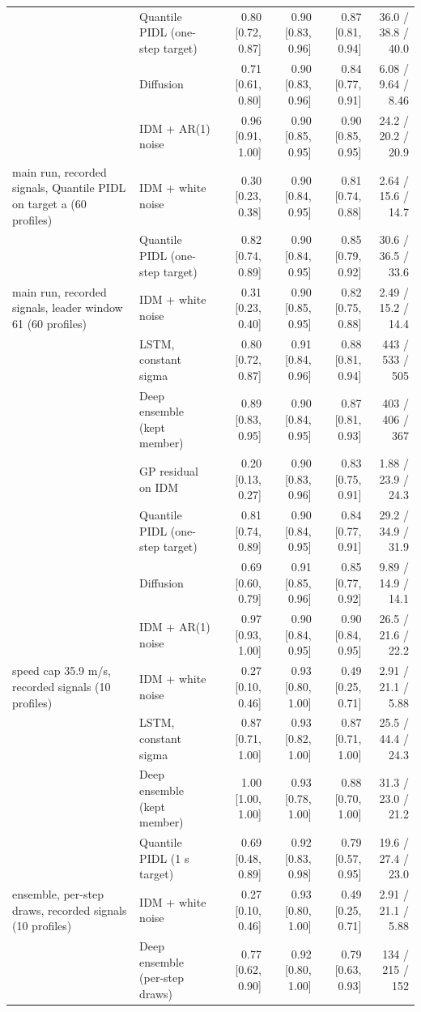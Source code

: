 \begin{longtable}{llrrrr}
 & Quantile PIDL (one-step target) & 0.80 [0.72, 0.87] & 0.90 [0.83, 0.96] & 0.87 [0.81, 0.94] & 36.0 / 38.8 / 40.0 \\
 & Diffusion & 0.71 [0.61, 0.80] & 0.90 [0.83, 0.96] & 0.84 [0.77, 0.91] & 6.08 / 9.64 / 8.46 \\
 & IDM + AR(1) noise & 0.96 [0.91, 1.00] & 0.90 [0.85, 0.95] & 0.90 [0.85, 0.95] & 24.2 / 20.2 / 20.9 \\
\midrule
main run, recorded signals, Quantile PIDL on target a (60 profiles) & IDM + white noise & 0.30 [0.23, 0.38] & 0.90 [0.84, 0.95] & 0.81 [0.74, 0.88] & 2.64 / 15.6 / 14.7 \\
 & Quantile PIDL (one-step target) & 0.82 [0.74, 0.89] & 0.90 [0.84, 0.95] & 0.85 [0.79, 0.92] & 30.6 / 36.5 / 33.6 \\
\midrule
main run, recorded signals, leader window 61 (60 profiles) & IDM + white noise & 0.31 [0.23, 0.40] & 0.90 [0.85, 0.95] & 0.82 [0.75, 0.88] & 2.49 / 15.2 / 14.4 \\
 & LSTM, constant sigma & 0.80 [0.72, 0.87] & 0.91 [0.84, 0.96] & 0.88 [0.81, 0.94] & 443 / 533 / 505 \\
 & Deep ensemble (kept member) & 0.89 [0.83, 0.95] & 0.90 [0.84, 0.95] & 0.87 [0.81, 0.93] & 403 / 406 / 367 \\
 & GP residual on IDM & 0.20 [0.13, 0.27] & 0.90 [0.83, 0.96] & 0.83 [0.75, 0.91] & 1.88 / 23.9 / 24.3 \\
 & Quantile PIDL (one-step target) & 0.81 [0.74, 0.89] & 0.90 [0.84, 0.95] & 0.84 [0.77, 0.91] & 29.2 / 34.9 / 31.9 \\
 & Diffusion & 0.69 [0.60, 0.79] & 0.91 [0.85, 0.96] & 0.85 [0.77, 0.92] & 9.89 / 14.9 / 14.1 \\
 & IDM + AR(1) noise & 0.97 [0.93, 1.00] & 0.90 [0.84, 0.95] & 0.90 [0.84, 0.95] & 26.5 / 21.6 / 22.2 \\
\midrule
speed cap 35.9 m/s, recorded signals (10 profiles) & IDM + white noise & 0.27 [0.10, 0.46] & 0.93 [0.80, 1.00] & 0.49 [0.25, 0.71] & 2.91 / 21.1 / 5.88 \\
 & LSTM, constant sigma & 0.87 [0.71, 1.00] & 0.93 [0.82, 1.00] & 0.87 [0.71, 1.00] & 25.5 / 44.4 / 24.3 \\
 & Deep ensemble (kept member) & 1.00 [1.00, 1.00] & 0.93 [0.78, 1.00] & 0.88 [0.70, 1.00] & 31.3 / 23.0 / 21.2 \\
 & Quantile PIDL (1 s target) & 0.69 [0.48, 0.89] & 0.92 [0.83, 0.98] & 0.79 [0.57, 0.95] & 19.6 / 27.4 / 23.0 \\
\midrule
ensemble, per-step draws, recorded signals (10 profiles) & IDM + white noise & 0.27 [0.10, 0.46] & 0.93 [0.80, 1.00] & 0.49 [0.25, 0.71] & 2.91 / 21.1 / 5.88 \\
 & Deep ensemble (per-step draws) & 0.77 [0.62, 0.90] & 0.92 [0.80, 1.00] & 0.79 [0.63, 0.93] & 134 / 215 / 152 \\
\end{longtable}
\endgroup
